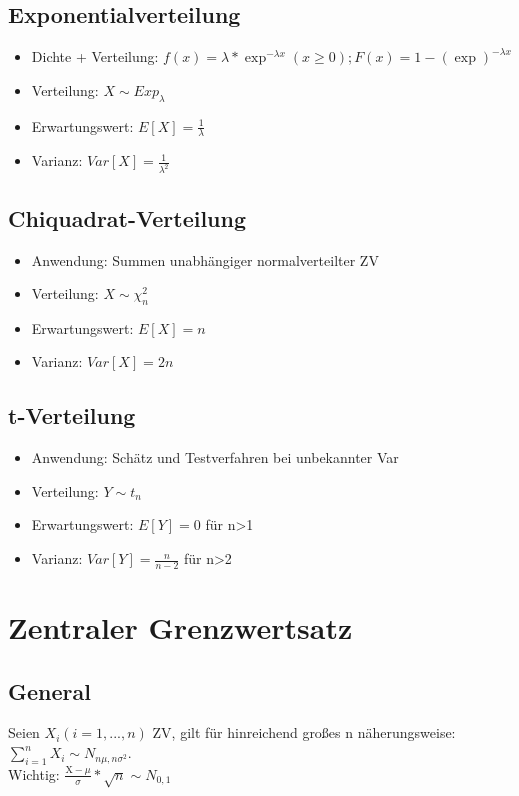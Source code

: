 \documentclass[10pt,landscape,a4paper]{article}
\begin{document}
\begin{multicols}{3}
\subsection{Exponentialverteilung}
\begin{itemize}
	\setlength\itemsep{-0.5em}
	\item Dichte + Verteilung: $f(x) = \lambda * \exp^{-\lambda x}(x \geq 0); F(x) = 1-(\exp)^{-\lambda x}$
	\item Verteilung: $X \sim Exp_{\lambda}$
	\item Erwartungswert: $E[X] = \frac{1}{\lambda}$
	\item Varianz: $Var[X] = \frac{1}{\lambda^2}$
\end{itemize}

\subsection{Chiquadrat-Verteilung}
\begin{itemize}
	\setlength\itemsep{-0.5em}
	\item Anwendung: Summen unabhängiger normalverteilter ZV
	\item Verteilung: $X \sim \chi_n^2$
	\item Erwartungswert: $E[X] = n$
	\item Varianz: $Var[X] = 2n$
\end{itemize}

\subsection{t-Verteilung}
\begin{itemize}
	\setlength\itemsep{-0.5em}
	\item Anwendung: Schätz und Testverfahren bei unbekannter Var
	\item Verteilung: $Y \sim t_n$
	\item Erwartungswert: $E[Y]=0$ für n>1
	\item Varianz: $Var[Y] = \frac{n}{n-2}$ für n>2
\end{itemize}

\section{Zentraler Grenzwertsatz}
\subsection{General}
Seien $X_i (i=1,...,n)$ ZV, gilt für hinreichend großes n näherungsweise:$
	\sum\limits_{i=1}^nX_i \sim N_{n \mu , n \sigma^2}$. \\
Wichtig: $\frac{\text{\={X}} - \mu}{\sigma} * \sqrt{n} \sim N_{0, 1}$


\end{multicols}
\end{document}
